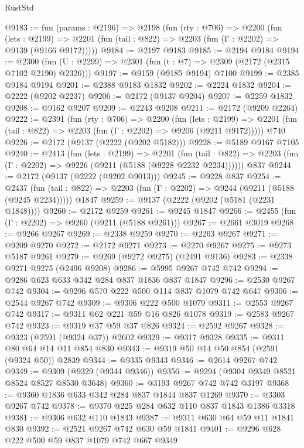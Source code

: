 \begin{lexlean}{RustStd}
\begin{coremodule}
@9183 := fun (params : @2196) =>
  @2198
    (fun (rty : @706) =>
    @2200
      (fun (lets : @2199) =>
      @2201 (fun (tail : @822) => @2203 (fun (Γ : @2202) => @9139 (@9166 @9172)))))
@9184 := @2197 @9183
@9185 := @2194 @9184
@9194 := @2300 (fun (U : @2299) => @2301 (fun (t : @7) => @2309 (@2172 (@2315 @7102 @2190) @2326)))
@9197 := @9159 (@9185 @9194) @7100
@9199 := @2385 @9184 @9194
@9201 := @2388 @9183 @1832
@9202 := @2224 @1832
@9204 := @2222 (@9202 @2237)
@9206 := @2172 (@9137 @9204)
@9207 := @2259 @1832
@9208 := @9162 @9207
@9209 := @2243 @9208
@9211 := @2172 (@9209 @2264)
@9222 := @2391
    (fun (rty : @706) =>
    @2200
      (fun (lets : @2199) =>
      @2201 (fun (tail : @822) => @2203 (fun (Γ : @2202) => @9206 (@9211 @9172)))))
    @740
@9226 := @2172 (@9137 (@2222 (@9202 @5182)))
@9228 := @5189 @9167 @7105
@9240 := @2413
    (fun (lets : @2199) =>
    @2201
      (fun (tail : @822) => @2203 (fun (Γ : @2202) => @9226 (@9211 (@5188 (@9228 @2232 @2234))))))
    @837
@9244 := @2172 (@9137 (@2222 (@9202 @9013)))
@9245 := @9228 @837
@9254 := @2437
    (fun (tail : @822) => @2203 (fun (Γ : @2202) => @9244 (@9211 (@5188 (@9245 @2234)))))
    @1847
@9259 := @9137 (@2222 (@9202 (@5181 (@2231 @1848))))
@9260 := @2172 @9259
@9261 := @9245 @1847
@9266 := @2455 (fun (Γ : @2202) => @9260 (@9211 (@5188 @9261)))
@9267 := @2661 @3019
@9268 := @9266 @9267
@9269 := @2338 @9259
@9270 := @2263 @9267
@9271 := @9209 @9270
@9272 := @2172 @9271
@9273 := @2270 @9267
@9275 := @9273 @5187 @9261
@9279 := @9269 (@9272 @9275) (@2491 @9136)
@9283 := @2338 @9271 @9275 (@2496 @9208)
@9286 := @5995 @9267 @742 @742
@9294 := @9286 @623 @633 @342 @284 @837 @1836 @837 @1847
@9296 := @2530 @9267 @742
@9304 := @9296 @570 @222 @500 @114 @837 @1079 @742 @647
@9306 := @2544 @9267 @742
@9309 := @9306 @222 @500 @1079
@9311 := @2553 @9267 @742
@9317 := @9311 @62 @221 @59 @16 @826 @1078
@9319 := @2583 @9267 @742
@9323 := @9319 @37 @59 @37 @826
@9324 := @2592 @9267
@9328 := @9323 (@2591 (@9324 @37)) @2602
@9329 := @9317 @9328
@9335 := @9311 @80 @64 @14 @11 @854 @830
@9343 := @9319 @50 @14 @50 @854 (@2591 (@9324 @50)) @2839
@9344 := @9335 @9343
@9346 := @2614 @9267 @742
@9349 := @9309 (@9329 (@9344 @9346))
@9356 := @9294 (@9304 @9349 @8521 @8524 @8527 @8530 @3648)
@9360 := @3193 @9267 @742 @742 @3197
@9368 := @9360 @1836 @633 @342 @284 @837 @1844 @837 @1269
@9370 := @3303 @9267 @742
@9378 := @9370 @225 @284 @632 @110 @837 @1843 @1386 @3318
@9381 := @9306 @632 @110 @1843
@9387 := @9311 @630 @64 @59 @11 @1841 @830
@9392 := @2521 @9267 @742 @630 @59 @1841
@9401 := @9296 @628 @222 @500 @59 @837 @1079 @742 @667 @9349

\end{coremodule}
\end{lexlean}
